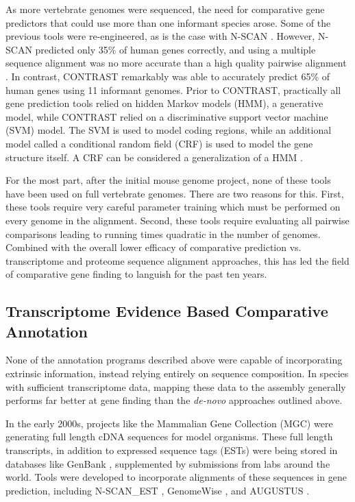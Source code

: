 \documentclass[fleqn,10pt]{wlscirep}
\begin{document}
As more vertebrate genomes were sequenced, the need for comparative gene predictors that could use more than one informant species arose. Some of the previous tools were re-engineered, as is the case with N-SCAN \cite{gross2006using,van2007using}. However, N-SCAN predicted only 35\% of human genes correctly, and using a multiple sequence alignment was no more accurate than a high quality pairwise alignment \cite{flicek2007gene}. In contrast, CONTRAST \cite{gross2007contrast} remarkably was able to accurately predict 65\% of human genes using 11 informant genomes. Prior to CONTRAST, practically all gene prediction tools relied on hidden Markov models (HMM), a generative model, while CONTRAST relied on a discriminative support vector machine (SVM) model. The SVM is used to model coding regions, while an additional model called a conditional random field (CRF) is used to model the gene structure itself. A CRF can be considered a generalization of a HMM \cite{lafferty2001conditional}.

For the most part, after the initial mouse genome project, none of these tools have been used on full vertebrate genomes. There are two reasons for this. First, these tools require very careful parameter training which must be performed on every genome in the alignment. Second, these tools require evaluating all pairwise comparisons leading to running times quadratic in the number of genomes. Combined with the overall lower efficacy of comparative prediction vs. transcriptome and proteome sequence alignment approaches, this has led the field of comparative gene finding to languish for the past ten years.

\subsection{Transcriptome Evidence Based Comparative Annotation}

None of the annotation programs described above were capable of incorporating extrinsic information, instead relying entirely on sequence composition. In species with sufficient transcriptome data, mapping these data to the assembly generally performs far better at gene finding than the \textit{de-novo} approaches outlined above. 

In the early 2000s, projects like the Mammalian Gene Collection (MGC) \cite{mammalian2002generation} were generating full length cDNA sequences for model organisms. These full length transcripts, in addition to expressed sequence tags (ESTs) were being stored in databases like GenBank \cite{benson2000genbank}, supplemented by submissions from labs around the world. Tools were developed to incorporate alignments of these sequences in gene prediction, including N-SCAN\_EST \cite{wei2006using},  GenomeWise \cite{birney2004genewise}, and AUGUSTUS \cite{stanke2008using}.
\end{document}
